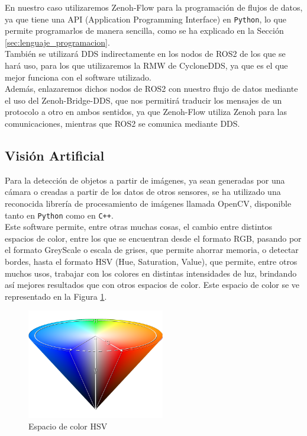 En nuestro caso utilizaremos Zenoh-Flow para la programación de flujos de datos,
ya que tiene una API (Application Programming Interface) en \texttt{Python}, lo
que permite programarlos de manera sencilla, como se ha explicado en la Sección
\ref{sec:lenguaje_programacion}.
\\

También se utilizará DDS indirectamente en los nodos de ROS2 de los que se hará
uso, para los que utilizaremos la RMW de CycloneDDS, ya que es el que mejor
funciona con el software utilizado.
\\

Además, enlazaremos dichos nodos de ROS2 con nuestro flujo de datos mediante el
uso del Zenoh-Bridge-DDS, que nos permitirá traducir los mensajes de un
protocolo a otro en ambos sentidos, ya que Zenoh-Flow utiliza Zenoh para las
comunicaciones, mientras que ROS2 se comunica mediante DDS.
\\


\subsection{Visión Artificial}
\label{sec:vision_artificial}

Para la detección de objetos a partir de imágenes, ya sean generadas por una
cámara o creadas a partir de los datos de otros sensores, se ha utilizado una
reconocida librería de procesamiento de imágenes llamada OpenCV, disponible
tanto en \texttt{Python} como en \texttt{C++}.
\\

Este software permite, entre otras muchas cosas, el cambio entre distintos
espacios de color, entre los que se encuentran desde el formato RGB, pasando
por el formato GreyScale o escala de grises, que permite ahorrar memoria, o
detectar bordes, hasta el formato HSV (Hue, Saturation, Value), que permite,
entre otros muchos usos, trabajar con los colores en distintas intensidades de
luz, brindando así mejores resultados que con otros espacios de color.
Este espacio de color se ve representado en la Figura \ref{fig:hsv}.
\\

\begin{figure} [h!]
  \begin{center}
    \includegraphics[width=6cm]{figs/hsv_cone}
  \end{center}
  \caption{Espacio de color HSV \cite{hsv_cone}}
  \label{fig:hsv}
\end{figure}\

